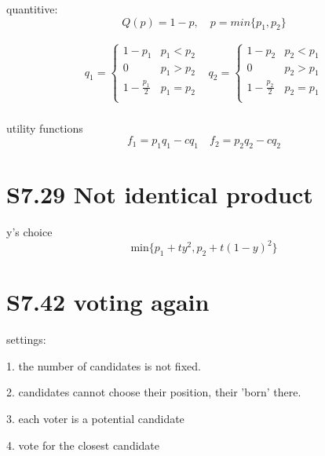 \documentclass[12pt,a4paper]{article}
\begin{document}
quantitive: \[ Q(p) = 1-p,\quad p=min\{p_1,p_2\}\]

\[
\begin{array}{ll}
q_1 = \left\{ 
\begin{array}{ll}
	1-p_1 & p_1 < p_2 \\
	0 & p_1 > p_2 \\
	1-\frac{p_1}{2} & p_1 = p_2 \\
\end{array} \right . &  q_2 = \left \{ 
\begin{array}{ll}
	1-p_2 & p_2 < p_1 \\
	0 & p_2 > p_1 \\
	1-\frac{p_2}{2} & p_2 = p_1 \\
\end{array} \right . \\
\end{array}
\]

utility functions
\[
f_1 = p_1q_1-cq_1 \quad f_2 = p_2q_2 - cq_2
\]


\section{S7.29 Not identical product}

\begin{center}
\end{center}

y's choice
\[
\mathrm{min}\{p_1+ty^2,p_2+t(1-y)^2\}
\]

\section{S7.42 voting again}

settings:

1. the number of candidates is not fixed.

2. candidates cannot choose their position, their 'born' there.

3. each voter is a potential candidate

4. vote for the closest candidate
\end{document}
